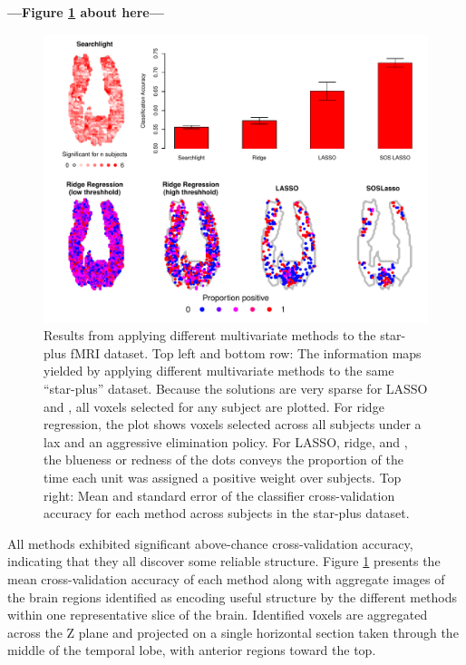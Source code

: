 \begin{center}
\textbf{---Figure \ref{fig.brain} about here---}
\end{center}

\begin{figure}
\centering
\includegraphics[width=.9\textwidth]{figures/cmu_all_results.pdf}
\caption{Results from applying different multivariate methods to the star-plus fMRI dataset. Top left and bottom row: The information maps yielded by applying different multivariate methods to the same ``star-plus'' dataset. Because the solutions are very sparse for LASSO and \soslasso, all voxels selected for any subject are plotted. For ridge regression, the plot shows voxels selected across all subjects under a lax and an aggressive elimination policy. For LASSO, ridge, and \soslasso, the blueness or redness of the dots conveys the proportion of the time each unit was assigned a positive weight over subjects. Top right: Mean and standard error of the classifier cross-validation accuracy for each method across subjects in the star-plus dataset.}
\label{fig.brain}  
\end{figure}

All methods exhibited significant above-chance cross-validation accuracy, indicating that they all discover some reliable structure. Figure \ref{fig.brain} presents the mean cross-validation accuracy of each method along with aggregate images of the brain regions identified as encoding useful structure by the different methods within one representative slice of the brain.  Identified voxels are aggregated across the Z plane and projected on a single horizontal section taken through the middle of the temporal lobe, with anterior regions toward the top. 


